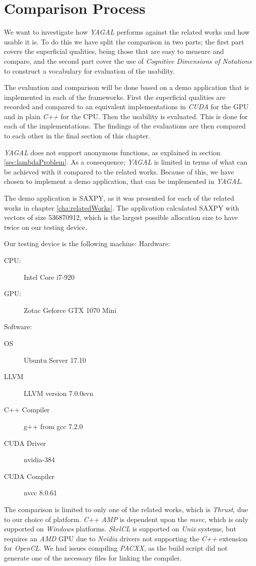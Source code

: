 \section{Comparison Process}\label{sec:comparisonProc}
We want to investigate how \textit{YAGAL} performs against the related works and how usable it is. To do this we have split the comparison in two parts; the first part covers the superficial qualities, being those that are easy to measure and compare, and the second part cover the use of \textit{Cognitive Dimensions of Notations} to construct a vocabulary for evaluation of the usability.

The evaluation and comparison will be done based on a demo application that is implemented in each of the frameworks. First the superficial qualities are recorded and compared to an equivalent implementations in \textit{CUDA} for the GPU and in plain \textit{C++} for the CPU. Then the usability is evaluated. This is done for each of the implementations. The findings of the evaluations are then compared to each other in the final section of this chapter.

\textit{YAGAL} does not support anonymous functions, as explained in section \ref{sec:lambdaProblem}. As a consequence; \textit{YAGAL} is limited in terms of what can be achieved with it compared to the related works. Because of this, we have chosen to implement a demo application, that can be implemented in \textit{YAGAL}. 

The demo application is SAXPY, as it was presented for each of the related works in chapter \ref{cha:relatedWorks}. The application calculated SAXPY with vectors of size 536870912, which is the largest possible allocation size to have twice on our testing device.

Our testing device is the following machine:
Hardware:
\begin{description}
\item[CPU:] Intel Core i7-920
\item[GPU:] Zotac Geforce GTX 1070 Mini
\end{description}

Software:
\begin{description}
\item[OS] Ubuntu Server 17.10
\item[LLVM] LLVM version  7.0.0svn
\item[C++ Compiler] g++ from gcc 7.2.0
\item[CUDA Driver] nvidia-384
\item[CUDA Compiler] nvcc 8.0.61
\end{description}

The comparison is limited to only one of the related works, which is \textit{Thrust}, due to our choice of platform. \textit{C++ AMP} is dependent upon the \textit{msvc}, which is only supported on \textit{Windows} platforms. \textit{SkelCL} is supported on \textit{Unix} systems, but requires an \textit{AMD} GPU due to \textit{Nvidia} drivers not supporting the \textit{C++} extension for \textit{OpenCL}. We had issues compiling \textit{PACXX}, as the build script did not generate one of the necessary files for linking the compiler.
